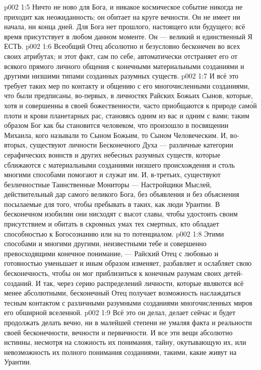 \vs p002 1:5 Ничто не ново для Бога, и никакое космическое событие никогда не приходит как неожиданность; он обитает на круге вечности. Он не имеет ни начала, ни конца дней. Для Бога нет прошлого, настоящего или будущего; всё время присутствует в любом данном моменте. Он --- великий и единственный Я ЕСТЬ.
\vs p002 1:6 \pc Всеобщий Отец абсолютно и безусловно бесконечен во всех своих атрибутах; и этот факт, сам по себе, автоматически отстраняет его от всякого прямого личного общения с конечными материальными созданиями и другими низшими типами созданных разумных существ.
\vs p002 1:7 И всё это требует таких мер по контакту и общению с его многочисленными созданиями, что были предписаны, во\hyp{}первых, в личностях Райских Божьих Сынов, которые, хотя и совершенны в своей божественности, часто приобщаются к природе сам\'ой плоти и крови планетарных рас, становясь одним из вас и одним с вами; таким образом Бог как бы становится человеком, что произошло в посвящении Михаила, кого называли то Сыном Божьим, то Сыном Человеческим. И, во\hyp{}вторых, существуют личности Бесконечного Духа --- различные категории серафических воинств и других небесных разумных существ, которые сближаются с материальными созданиями низшего происхождения и столь многими способами помогают и служат им. И, в\hyp{}третьих, существуют безличностные Таинственные Мониторы --- Настройщики Мыслей, действительный дар самог\'о великого Бога, без объявления и без объяснения посылаемые для того, чтобы пребывать в таких, как люди Урантии. В бесконечном изобилии они нисходят с высот славы, чтобы удостоить своим присутствием и обитать в скромных умах тех смертных, кто обладает способностью к Богосознанию или на то потенциалом.
\vs p002 1:8 Этими способами и многими другими, неизвестными тебе и совершенно превосходящими конечное понимание, --- Райский Отец с любовью и готовностью уменьшает и иным образом изменяет, разбавляет и ослабляет свою бесконечность, чтобы он мог приблизиться к конечным разумам своих детей\hyp{}созданий. И так, через серию распределений личности, которые являются всё менее абсолютными, бесконечный Отец получает возможность наслаждаться тесным контактом с различными разумными созданиями многочисленных миров его обширной вселенной.
\vs p002 1:9 Всё это он делал, делает сейчас и будет продолжать делать вечно, ни в малейшей степени не умаляя факта и реальности своей бесконечности, вечности и первичности. И все эти вещи абсолютно истинны, несмотря на сложность их понимания, тайну, окутывающую их, или невозможность их полного понимания созданиями, такими, какие живут на Урантии.
